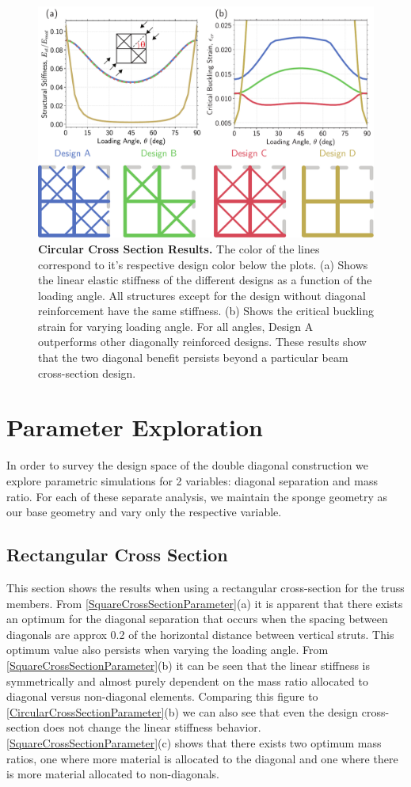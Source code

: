 \documentclass[10pt,twoside]{fernandes_supp}
\begin{document}
\begin{figure}
	\centering
	\includegraphics[width=0.6\linewidth]{SFig7.pdf}
	\caption{{\bf Circular Cross Section Results.} The color of the lines correspond to it's respective design color below the plots. (a) Shows the linear elastic stiffness of the different designs as a function of the loading angle. All structures except for the design without diagonal reinforcement have the same stiffness. (b) Shows the critical buckling strain for varying loading angle. For all angles, Design A outperforms other diagonally reinforced designs. These results show that the two diagonal benefit persists beyond a particular beam cross-section design.}
	
	\label{CircularCrossSection}
\end{figure}
\section{Parameter Exploration}
In order to survey the design space of the double diagonal construction we explore parametric simulations for 2 variables: diagonal separation and mass ratio. For each of these separate analysis, we maintain the sponge geometry as our base geometry and vary only the respective variable. 

\subsection{Rectangular Cross Section}\label{sec:rectparam}
This section shows the results when using a rectangular cross-section for the truss members. From \cref{SquareCrossSectionParameter}(a) it is apparent that there exists an optimum for the diagonal separation that occurs when the spacing between diagonals are approx 0.2 of the horizontal distance between vertical struts. This optimum value also persists when varying the loading angle. From \cref{SquareCrossSectionParameter}(b) it can be seen that the linear stiffness is symmetrically and almost purely dependent on the mass ratio allocated to diagonal versus non-diagonal elements. Comparing this figure to \cref{CircularCrossSectionParameter}(b) we can also see that even the design cross-section does not change the linear stiffness behavior.  \cref{SquareCrossSectionParameter}(c) shows that there exists two optimum mass ratios, one where more material is allocated to the diagonal and one where there is more material allocated to non-diagonals.
\end{document}
